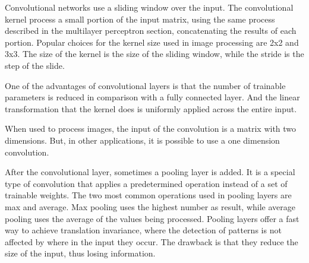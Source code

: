 Convolutional networks \cite{lecun_backpropagation_1989}\cite{lecun_convolutional_1995} use a sliding window over the input. The convolutional kernel process a small portion of the input matrix, using the same process described in the multilayer perceptron section, concatenating the results of each portion. Popular choices for the kernel size used in image processing are 2x2 and 3x3. The size of the kernel is the size of the sliding window, while the stride is the step of the slide.

One of the advantages of convolutional layers is that the number of trainable parameters is reduced in comparison with a fully connected layer. And the linear transformation that the kernel does is uniformly applied across the entire input.

When used to process images, the input of the convolution is a matrix with two dimensions. But, in other applications, it is possible to use a one dimension convolution.

After the convolutional layer, sometimes a pooling layer is added. It is a special type of convolution that applies a predetermined operation instead of a set of trainable weights. The two most common operations used in pooling layers are max and average. Max pooling uses the highest number as result, while average pooling uses the average of the values being processed. Pooling layers offer a fast way to achieve translation invariance, where the detection of patterns is not affected by where in the input they occur. The drawback is that they reduce the size of the input, thus losing information.
